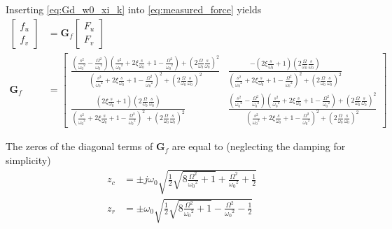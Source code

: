 \documentclass[Afour,sagev,times]{sagej}
\begin{document}
Inserting \eqref{eq:Gd_w0_xi_k} into \eqref{eq:measured_force} yields
\begin{align}
  \begin{bmatrix} f_{u} \\ f_{v} \end{bmatrix} &= \bm{G}_{f} \begin{bmatrix} F_u \\ F_v \end{bmatrix} \label{eq:Gf_mimo_tf} \\
  \bm{G}_{f} &= \begin{bmatrix}
  \frac{\left( \frac{s^2}{{\omega_0}^2} - \frac{\Omega^2}{{\omega_0}^2} \right) \left( \frac{s^2}{{\omega_0}^2} + 2 \xi \frac{s}{\omega_0} + 1 - \frac{{\Omega}^2}{{\omega_0}^2} \right) + \left( 2 \frac{\Omega}{\omega_0} \frac{s}{\omega_0} \right)^2}{\left( \frac{s^2}{{\omega_0}^2} + 2 \xi \frac{s}{\omega_0} + 1 - \frac{{\Omega}^2}{{\omega_0}^2} \right)^2 + \left( 2 \frac{\Omega}{\omega_0} \frac{s}{\omega_0} \right)^2} & \frac{- \left( 2 \xi \frac{s}{\omega_0} + 1 \right) \left( 2 \frac{\Omega}{\omega_0} \frac{s}{\omega_0} \right)}{\left( \frac{s^2}{{\omega_0}^2} + 2 \xi \frac{s}{\omega_0} + 1 - \frac{{\Omega}^2}{{\omega_0}^2} \right)^2 + \left( 2 \frac{\Omega}{\omega_0} \frac{s}{\omega_0} \right)^2} \\
  \frac{\left( 2 \xi \frac{s}{\omega_0} + 1 \right) \left( 2 \frac{\Omega}{\omega_0} \frac{s}{\omega_0} \right)}{\left( \frac{s^2}{{\omega_0}^2} + 2 \xi \frac{s}{\omega_0} + 1 - \frac{{\Omega}^2}{{\omega_0}^2} \right)^2 + \left( 2 \frac{\Omega}{\omega_0} \frac{s}{\omega_0} \right)^2} & \frac{\left( \frac{s^2}{{\omega_0}^2} - \frac{\Omega^2}{{\omega_0}^2} \right) \left( \frac{s^2}{{\omega_0}^2} + 2 \xi \frac{s}{\omega_0} + 1 - \frac{{\Omega}^2}{{\omega_0}^2} \right) + \left( 2 \frac{\Omega}{\omega_0} \frac{s}{\omega_0} \right)^2}{\left( \frac{s^2}{{\omega_0}^2} + 2 \xi \frac{s}{\omega_0} + 1 - \frac{{\Omega}^2}{{\omega_0}^2} \right)^2 + \left( 2 \frac{\Omega}{\omega_0} \frac{s}{\omega_0} \right)^2}
\end{bmatrix} \label{eq:Gf}
\end{align}

The zeros of the diagonal terms of \(\bm{G}_f\) are equal to (neglecting the damping for simplicity)
\begin{subequations}
  \begin{align}
    z_c &= \pm j \omega_0 \sqrt{\frac{1}{2} \sqrt{8 \frac{\Omega^2}{{\omega_0}^2} + 1} + \frac{\Omega^2}{{\omega_0}^2} + \frac{1}{2} } \label{eq:iff_zero_cc} \\
    z_r &= \pm   \omega_0 \sqrt{\frac{1}{2} \sqrt{8 \frac{\Omega^2}{{\omega_0}^2} + 1} - \frac{\Omega^2}{{\omega_0}^2} - \frac{1}{2} } \label{eq:iff_zero_real}
  \end{align}
\end{subequations}
\end{document}
